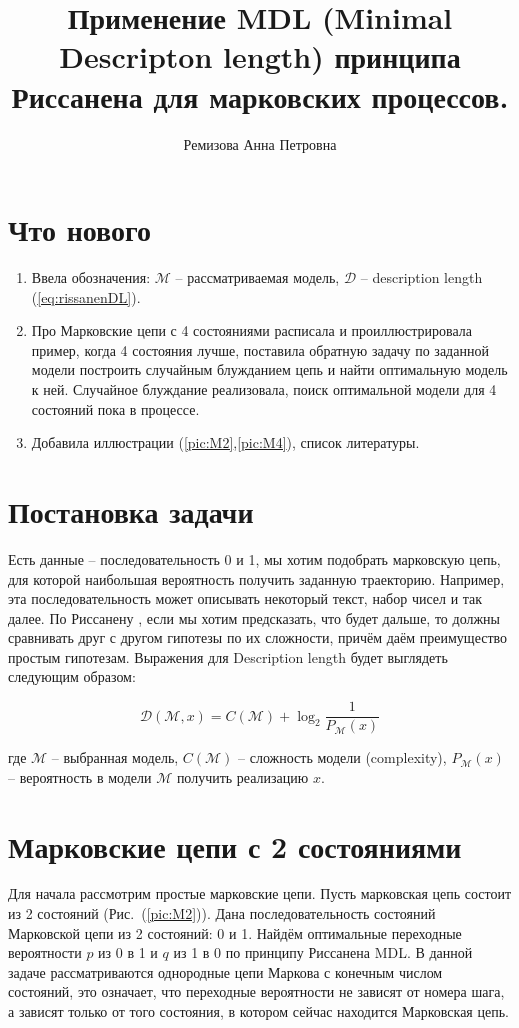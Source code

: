 \documentclass[12pt]{article}
\begin{document}
	\title{Применение MDL (Minimal Descripton length) принципа Риссанена для марковских процессов.}
	\author{Ремизова Анна Петровна}
	\maketitle
	
	\section*{Что нового}
	\begin{enumerate}
		\item Ввела обозначения: $\mathcal{M}$ -- рассматриваемая модель, $\mathcal{D}$ -- description length (\ref{eq:rissanenDL}).
		\item Про Марковские цепи с 4 состояниями расписала и проиллюстрировала пример, когда 4 состояния лучше, поставила обратную задачу по заданной модели построить случайным блужданием цепь и найти оптимальную модель к ней. Случайное блуждание реализовала, поиск оптимальной модели для 4 состояний пока в процессе.
		\item Добавила иллюстрации (\ref{pic:M2},\ref{pic:M4}), список литературы.
	\end{enumerate}
	
	\section*{Постановка задачи}
	 Есть данные -- последовательность 0 и 1, мы хотим подобрать марковскую цепь, для которой наибольшая вероятность получить заданную траекторию. Например, эта последовательность может описывать некоторый текст, набор чисел и так далее. По Риссанену \cite{rissanen}, если мы хотим предсказать, что будет дальше, то должны сравнивать друг с другом гипотезы по их сложности, причём даём преимущество простым гипотезам. Выражения для Description length будет выглядеть следующим образом:
	
	\begin{equation}\label{eq:rissanenDL}\mathcal{D}(\mathcal{M},x) = C(\mathcal{M})+\log_2{\frac{1}{P_{\mathcal{M}}(x)}}\end{equation}
	
	где $\mathcal{M}$ -- выбранная модель, $C(\mathcal{M})$ -- сложность модели (complexity), $P_{\mathcal{M}}(x)$ -- вероятность в модели $\mathcal{M}$ получить реализацию $x$.
	
	\section*{Марковские цепи с 2 состояниями}
	Для начала рассмотрим простые марковские цепи. Пусть марковская цепь состоит из 2 состояний (Рис.~(\ref{pic:M2})). Дана последовательность состояний Марковской цепи из 2 состояний: 0 и 1. Найдём оптимальные переходные вероятности $p$ из 0 в 1 и $q$ из 1 в 0 по принципу Риссанена MDL. В данной задаче рассматриваются однородные цепи Маркова с конечным числом состояний, это означает, что переходные вероятности не зависят от номера шага, а зависят только от того состояния, в котором сейчас находится Марковская цепь. 
	
\end{document}
